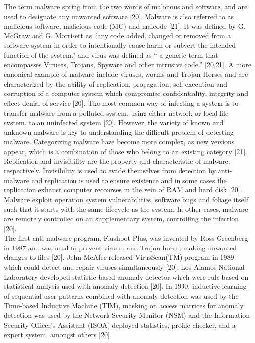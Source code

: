 \documentclass[12pt]{article} %
\begin{document}
The term malware spring from the two words of malicious and software, and are used to designate any unwanted software [20]. Malware is also referred to as malicious software, malicious code (MC) and malcode [21]. It was defined by G. McGraw and G. Morrisett as “any code added, changed or removed from a software system in order to intentionally cause harm or subvert the intended function of the system.” and virus was defined as “ a generic term that encompasses Viruses, Trojans, Spyware and other intrusive code.” [20,21]. A more canonical example of malware include viruses, worms and Trojan Horses and are characterized by the ability of replication, propagation, self-execution and corruption of a computer system which compromise confidentiality, integrity and effect denial of service [20]. The most common way of infecting a system is to transfer malware from a polluted system, using either network or local file system, to an uninfected system [20]. However, the variety of known and unknown malware is key to understanding the difficult problem of detecting malware. Categorizing malware have become more complex, as new versions appear, which is a combination of those who belong to an existing category [21]. Replication and invisibility are the property and characteristic of malware, respectively. Invisibility is used to evade themselves from detection by anti-malware and replication is used to ensure existence and in some cases the replication exhaust computer recourses in the vein of RAM and hard disk [20]. Malware exploit operation system vulnerabilities, software bugs and foliage itself such that it starts with the same lifecycle as the system. In other cases, malware are remotely controlled on an supplementary system, controlling the infection [20]. \\
The first anti-malware program, Flushbot Plus, was invented by Ross Greenberg in 1987 and was used to prevent viruses and Trojan horses making unwanted changes to files [20]. John McAfee released VirusScan(TM) program in 1989 which could detect and repair viruses simultaneously [20]. Los Alamos National Laboratory developed statistic-based anomaly detector which were rule-based on statistical analysis used with anomaly detection [20]. In 1990, inductive learning of sequential user patterns combined with anomaly detection was used by the Time-based Inductive Machine (TIM), masking on access matrices for anomaly detection was used by the Network Security Monitor (NSM) and the Information Security Officer’s Assistant (ISOA) deployed statistics, profile checker, and a expert system, amongst others [20]. \\
\end{document}
